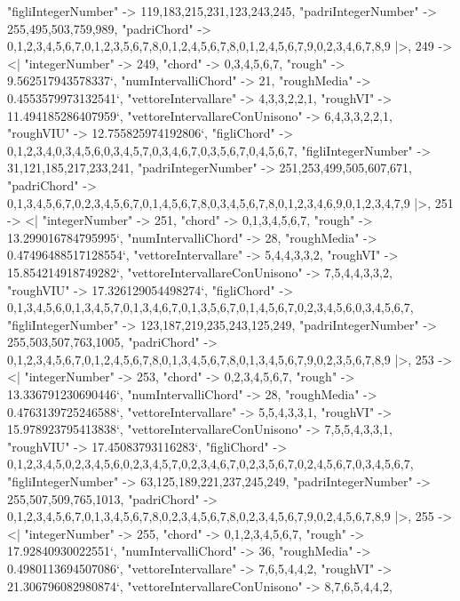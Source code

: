 \documentclass[
]{article}
\begin{document}
\begin{DatasetVerbatim}
    "figliIntegerNumber" -> {119,183,215,231,123,243,245},
    "padriIntegerNumber" -> {255,495,503,759,989},
    "padriChord" -> {{0,1,2,3,4,5,6,7},{0,1,2,3,5,6,7,8},{0,1,2,4,5,6,7,8},{0,1,2,4,5,6,7,9},{0,2,3,4,6,7,8,9}}
  |>,
  249 -> <|
    "integerNumber" -> 249,
    "chord" -> {0,3,4,5,6,7},
    "rough" -> 9.562517943578337`,
    "numIntervalliChord" -> 21,
    "roughMedia" -> 0.4553579973132541`,
    "vettoreIntervallare" -> {4,3,3,2,2,1},
    "roughVI" -> 11.494185286407959`,
    "vettoreIntervallareConUnisono" -> {6,4,3,3,2,2,1},
    "roughVIU" -> 12.755825974192806`,
    "figliChord" -> {{0,1,2,3,4},{0,3,4,5,6},{0,3,4,5,7},{0,3,4,6,7},{0,3,5,6,7},{0,4,5,6,7}},
    "figliIntegerNumber" -> {31,121,185,217,233,241},
    "padriIntegerNumber" -> {251,253,499,505,607,671},
    "padriChord" -> {{0,1,3,4,5,6,7},{0,2,3,4,5,6,7},{0,1,4,5,6,7,8},{0,3,4,5,6,7,8},{0,1,2,3,4,6,9},{0,1,2,3,4,7,9}}
  |>,
  251 -> <|
    "integerNumber" -> 251,
    "chord" -> {0,1,3,4,5,6,7},
    "rough" -> 13.299016784795995`,
    "numIntervalliChord" -> 28,
    "roughMedia" -> 0.47496488517128554`,
    "vettoreIntervallare" -> {5,4,4,3,3,2},
    "roughVI" -> 15.854214918749282`,
    "vettoreIntervallareConUnisono" -> {7,5,4,4,3,3,2},
    "roughVIU" -> 17.326129054498274`,
    "figliChord" -> {{0,1,3,4,5,6},{0,1,3,4,5,7},{0,1,3,4,6,7},{0,1,3,5,6,7},{0,1,4,5,6,7},{0,2,3,4,5,6},{0,3,4,5,6,7}},
    "figliIntegerNumber" -> {123,187,219,235,243,125,249},
    "padriIntegerNumber" -> {255,503,507,763,1005},
    "padriChord" -> {{0,1,2,3,4,5,6,7},{0,1,2,4,5,6,7,8},{0,1,3,4,5,6,7,8},{0,1,3,4,5,6,7,9},{0,2,3,5,6,7,8,9}}
  |>,
  253 -> <|
    "integerNumber" -> 253,
    "chord" -> {0,2,3,4,5,6,7},
    "rough" -> 13.336791230690446`,
    "numIntervalliChord" -> 28,
    "roughMedia" -> 0.4763139725246588`,
    "vettoreIntervallare" -> {5,5,4,3,3,1},
    "roughVI" -> 15.978923795413838`,
    "vettoreIntervallareConUnisono" -> {7,5,5,4,3,3,1},
    "roughVIU" -> 17.45083793116283`,
    "figliChord" -> {{0,1,2,3,4,5},{0,2,3,4,5,6},{0,2,3,4,5,7},{0,2,3,4,6,7},{0,2,3,5,6,7},{0,2,4,5,6,7},{0,3,4,5,6,7}},
    "figliIntegerNumber" -> {63,125,189,221,237,245,249},
    "padriIntegerNumber" -> {255,507,509,765,1013},
    "padriChord" -> {{0,1,2,3,4,5,6,7},{0,1,3,4,5,6,7,8},{0,2,3,4,5,6,7,8},{0,2,3,4,5,6,7,9},{0,2,4,5,6,7,8,9}}
  |>,
  255 -> <|
    "integerNumber" -> 255,
    "chord" -> {0,1,2,3,4,5,6,7},
    "rough" -> 17.92840930022551`,
    "numIntervalliChord" -> 36,
    "roughMedia" -> 0.4980113694507086`,
    "vettoreIntervallare" -> {7,6,5,4,4,2},
    "roughVI" -> 21.306796082980874`,
    "vettoreIntervallareConUnisono" -> {8,7,6,5,4,4,2},

\end{DatasetVerbatim}
\end{document}
